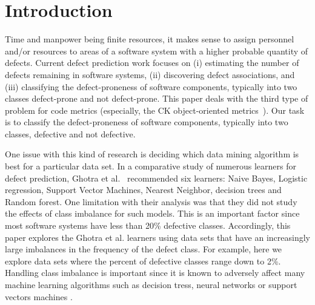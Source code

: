 \documentclass[sigconf,review, anonymous]{acmart}
\theoremstyle{break}
\theoremstyle{break}
\begin{document}



\section{Introduction}

Time and manpower being finite resources, it
makes sense to assign personnel and/or resources to areas of
a software system with a higher probable quantity of defects. Current defect prediction work focuses on (i) estimating the number of defects remaining in software systems, (ii) discovering defect associations, and (iii) classifying the defect-proneness of software components, typically into two classes defect-prone and not defect-prone. 
This paper deals with the third type of problem for code metrics (especially, the 
CK object-oriented metrics~\cite{chidamber1994metrics}).
Our task is to classify the defect-proneness of software components, typically into two classes, defective and not defective.

One issue with this kind of research is deciding
which data mining algorithm is best for a particular
data set. In a comparative study of numerous
learners for defect prediction, Ghotra et al.~\cite{ghotra2015revisiting} recommended six learners: Naive Bayes, Logistic regression, Support Vector Machines, Nearest Neighbor, decision trees and Random forest. One limitation with their
analysis was that they did not study the effects of class imbalance for such models.
This is an important factor
since most software systems have less than 20\% defective classes. Accordingly, this paper
explores the Ghotra et al. learners using data
sets that have an increasingly large imbalances
in the frequency of the defect class. For
example, here we explore data sets where the percent
of defective classes
range down to 2\%. 
Handling class imbalance is important
since it is known to adversely affect
many machine learning algorithms such as decision tress,
neural networks or support vectors machines \cite{japkowicz2002class}. 
\end{document}
